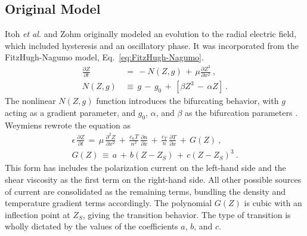 \subsection{Original Model}\label{ssec:original_Z_equation}
Itoh \emph{et al.} \cite{itoh_edge_1991} and Zohm \cite{zohm_dynamic_1994} originally modeled an evolution to the radial electric field, which included hysteresis and an oscillatory phase.
It was incorporated from the FitzHugh-Nagumo model, Eq.~\ref{eq:FitzHugh-Nagumo}.
\begin{align} %
	\frac{\partial Z}{\partial t} \,&=\, -N(Z,g) \,+\, \mu
		\frac{\partial Z^2}{\partial x^2}~,\label{eq:original_z} \\
	N(Z,g) \,&\equiv\, g \,-\, g_0 \,+\, \left[\beta Z^3 \,-\, \alpha Z\right]~.
\end{align}
The nonlinear $N(Z,g)$ function introduces the bifurcating behavior, with $g$ acting as a gradient parameter, and $g_0$, $\alpha$, and $\beta$ as the bifurcation parameters \cite{itoh_model_1988}.
Weymiens \cite{weymiens_bifurcation_2012} rewrote the equation as
\begin{align} %
	\epsilon \, \frac{\partial Z}{\partial t} \,=\, \mu \,
		\frac{\partial^2 Z}{\partial x^2} \,+\, \frac{c_n T}{n^2} \,
		\frac{\partial n}{\partial x} \,+\, \frac{c_T}{n} \,
		\frac{\partial T}{\partial x} \,+\, G(Z)~,\label{eq:paquay_Z} \\
	G(Z) \,\equiv\, a \,+\, b(Z - Z_S) \,+\, c(Z - Z_S)^3~.
		\label{eq:G_polynomial}
\end{align}
This form has includes the polarization current on the left-hand side and the shear viscosity as the first term on the right-hand side.
All other possible sources of current are consolidated as the remaining terms, bundling the density and temperature gradient terms accordingly.
The polynomial $G(Z)$ is cubic with an inflection point at $Z_S$, giving the transition behavior.
The type of transition is wholly dictated by the values of the coefficients $a$, $b$, and $c$.

